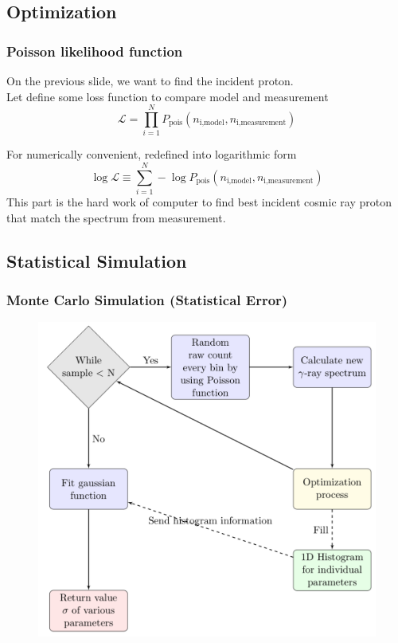 \documentclass{beamer}
\begin{document}
\subsection{Optimization}
\begin{frame}
\frametitle{Poisson likelihood function}
On the previous slide, we want to find the incident proton. \\
Let define some loss function to compare model and measurement
\begin{equation}
  \mathcal{L} = \prod_{i=1}^{N} P_{\text{pois}}(n_{\text{i,model}}, n_{\text{i,measurement}})
\end{equation}

For numerically convenient, redefined into logarithmic form
\begin{equation}
  \log\mathcal{L} \equiv \sum_{i=1}^{N} -\log P_{\text{pois}}(n_{\text{i,model}}, n_{\text{i,measurement}})
\end{equation}
This part is the hard work of computer to find best incident cosmic ray proton that match the
spectrum from measurement.

\end{frame}

\subsection{Statistical Simulation}
\begin{frame}\frametitle{Monte Carlo Simulation (Statistical Error)}
  \begin{figure}[h!]
    \includegraphics[width=0.7\textheight]{montestat}
    \end{figure}
\end{frame}
\end{document}
